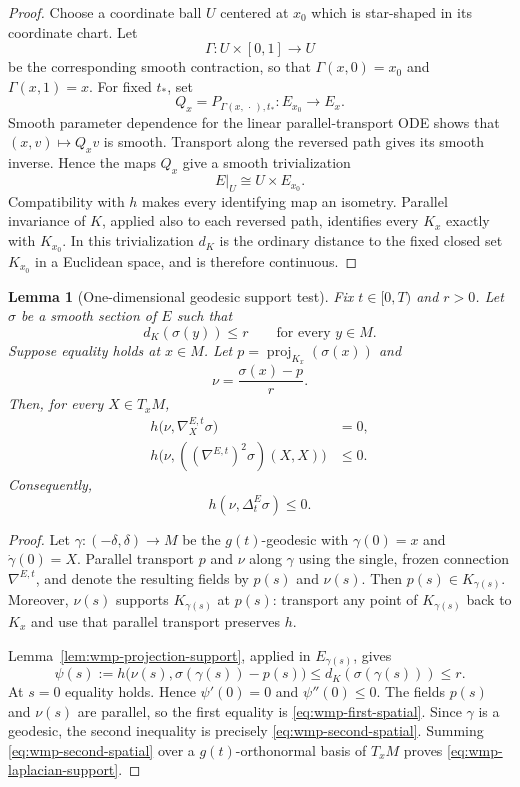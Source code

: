 \documentclass[10pt]{coll-l}
\newtheorem{lemma}[theorem]{Lemma}
\theoremstyle{definition}
\theoremstyle{remark}
\numberwithin{section}{chapter}
\numberwithin{equation}{chapter}
\begin{document}
\begin{proof}
Choose a coordinate ball $U$ centered at $x_0$ which is star-shaped in its
coordinate chart.  Let
\[
   \Gamma:U\times[0,1]\longrightarrow U
\]
be the corresponding smooth contraction, so that
$\Gamma(x,0)=x_0$ and $\Gamma(x,1)=x$.  For fixed $t_*$, set
\[
  Q_x=P_{\Gamma(x,\,\cdot\,),t_*}:E_{x_0}\longrightarrow E_x.
\]
Smooth parameter dependence for the linear parallel-transport ODE shows
that $(x,v)\mapsto Q_xv$ is smooth.  Transport along the reversed path gives
its smooth inverse.  Hence the maps $Q_x$ give a smooth trivialization
\[
       E|_U\cong U\times E_{x_0}.
\]
Compatibility with $h$ makes every identifying map an isometry.  Parallel
invariance of $K$, applied also to each reversed path, identifies every
$K_x$ exactly with $K_{x_0}$.  In this trivialization $d_K$ is the ordinary
distance to the fixed closed set $K_{x_0}$ in a Euclidean space, and is
therefore continuous.
\end{proof}

\begin{lemma}[One-dimensional geodesic support test]
\label{lem:wmp-geodesic-support}
Fix $t\in[0,T)$ and $r>0$.  Let $\sigma$ be a smooth section of $E$ such that
\[
       d_K(\sigma(y))\leq r\qquad\text{for every }y\in M.
\]
Suppose equality holds at $x\in M$.  Let
$p=\operatorname{proj}_{K_x}(\sigma(x))$ and
\[
       \nu=\frac{\sigma(x)-p}{r}.
\]
Then, for every $X\in T_xM$,
\begin{align}
 h\bigl(\nu,\nabla^{E,t}_X\sigma\bigr)&=0,                 \label{eq:wmp-first-spatial}\\
 h\bigl(\nu,((\nabla^{E,t})^2\sigma)(X,X)\bigr)&\leq0.     \label{eq:wmp-second-spatial}
\end{align}
Consequently,
\begin{equation}
       h(\nu,\Delta_t^E\sigma)\leq0.                       \label{eq:wmp-laplacian-support}
\end{equation}
\end{lemma}

\begin{proof}
Let $\gamma:(-\delta,\delta)\to M$ be the $g(t)$-geodesic with
$\gamma(0)=x$ and $\dot\gamma(0)=X$.  Parallel transport $p$ and $\nu$ along
$\gamma$ using the single, frozen connection $\nabla^{E,t}$, and denote the
resulting fields by $p(s)$ and $\nu(s)$.  Then $p(s)\in K_{\gamma(s)}$.
Moreover, $\nu(s)$ supports $K_{\gamma(s)}$ at $p(s)$: transport any point
of $K_{\gamma(s)}$ back to $K_x$ and use that parallel transport preserves
$h$.

Lemma~\ref{lem:wmp-projection-support}, applied in $E_{\gamma(s)}$, gives
\[
 \psi(s):=
 h\bigl(\nu(s),\sigma(\gamma(s))-p(s)\bigr)
 \leq d_K(\sigma(\gamma(s)))\leq r.
\]
At $s=0$ equality holds.  Hence $\psi'(0)=0$ and $\psi''(0)\leq0$.
The fields $p(s)$ and $\nu(s)$ are parallel, so the first equality is
\eqref{eq:wmp-first-spatial}.  Since $\gamma$ is a geodesic, the second
inequality is precisely \eqref{eq:wmp-second-spatial}.  Summing
\eqref{eq:wmp-second-spatial} over a $g(t)$-orthonormal basis of $T_xM$
proves \eqref{eq:wmp-laplacian-support}.
\end{proof}
\end{document}
